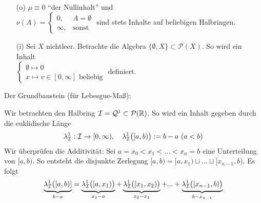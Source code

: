 \begin{example} \
\begin{enumerate}
	\item[(o)] $\mu \equiv 0$ ``der Nullinhalt'' und\\
				$\nu(A) = \begin{cases}
					0,       & A = \emptyset \\
					\infty, & \text{sonst}
				\end{cases}$
				sind stets Inhalte auf beliebigen Halbringen.
	\item[(i)] Sei $X$ nichtleer. Betrachte die Algebra $\{ \emptyset, X\} \subset \mathcal{P}(X)$. So wird ein Inhalt \\
			$\begin{cases}
				\emptyset \mapsto 0 \\
				x \mapsto v \in [0,\infty] \text{ beliebig}
			\end{cases}$
			definiert.
\end{enumerate}
\end{example}

Der Grundbaustein (für Lebesgue-Maß):
\begin{example}
Wir betrachten den Halbring $\mathcal{I} = \mathcal{Q}^1 \subset \mathcal{P}(\mathbb{R})$. So wird ein Inhalt gegeben durch die euklidische Länge
\begin{align}
\lambda^1_{\mathcal{I}} : \mathcal{I} \to [0, \infty), \quad \lambda^1_{\mathcal{I}} \big([a,b)\big) := b-a \ (a<b)
\end{align}
Wir überprüfen die Additivität: Sei $a = x_0 < x_1 < ... < x_{n} = b$ eine Unterteilung von $[a,b)$. So entsteht die disjunkte Zerlegung $[a,b) = [a,x_1) \sqcup ... \sqcup [x_{n-1},b)$. Es folgt 
\begin{equation}
\underbrace{\lambda^1_{\mathcal{I}} \big([a,b)]}_{b-a} = \underbrace{\lambda^1_{\mathcal{I}} \big( [a,x_1)\big)}_{x_1-a} + \underbrace{\lambda^1_{\mathcal{I}} \big([x_1,x_2)\big)}_{x_2 -x_1} + ... + \underbrace{\lambda^1_{\mathcal{I}} \big( [x_{n-1},b ) \big)}_{b-x_{n-1}}
\end{equation}
\end{example}


